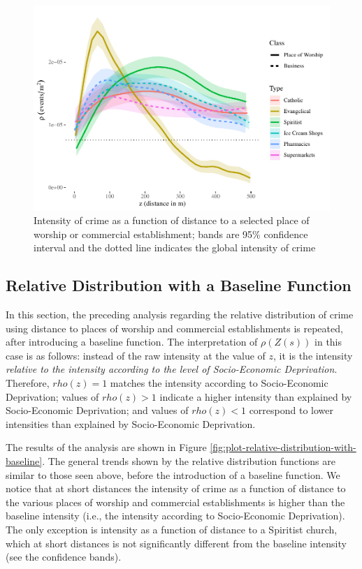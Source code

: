 \documentclass[smallextended]{svjour3}       %
\begin{document}
\begin{figure}
\centering
\includegraphics{Moral_Communities_and_Crime_files/figure-latex/figure-plot-relative-distribution-1.pdf}
\caption{\label{fig:plot-relative-distribution}Intensity of crime as a
function of distance to a selected place of worship or commercial
establishment; bands are 95\% confidence interval and the dotted line
indicates the global intensity of crime}
\end{figure}

\hypertarget{relative-distribution-with-a-baseline-function}{%
\subsection{Relative Distribution with a Baseline
Function}\label{relative-distribution-with-a-baseline-function}}

In this section, the preceding analysis regarding the relative
distribution of crime using distance to places of worship and commercial
establishments is repeated, after introducing a baseline function. The
interpretation of \(\rho(Z(s))\) in this case is as follows: instead of
the raw intensity at the value of \(z\), it is the intensity
\emph{relative to the intensity according to the level of Socio-Economic
Deprivation}. Therefore, \(rho(z)=1\) matches the intensity according to
Socio-Economic Deprivation; values of \(rho(z)>1\) indicate a higher
intensity than explained by Socio-Economic Deprivation; and values of
\(rho(z)<1\) correspond to lower intensities than explained by
Socio-Economic Deprivation.

The results of the analysis are shown in Figure
\ref{fig:plot-relative-distribution-with-baseline}. The general trends
shown by the relative distribution functions are similar to those seen
above, before the introduction of a baseline function. We notice that at
short distances the intensity of crime as a function of distance to the
various places of worship and commercial establishments is higher than
the baseline intensity (i.e., the intensity according to Socio-Economic
Deprivation). The only exception is intensity as a function of distance
to a Spiritist church, which at short distances is not significantly
different from the baseline intensity (see the confidence bands).
\end{document}
